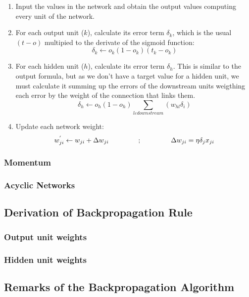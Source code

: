 \documentclass{article}
\begin{document}
		\begin{enumerate}

			\item Input the values in the network and obtain the output values computing every unit of the network.
			\item For each output unit ($k$), calculate its error term $\delta_k$, which is the usual $(t-o)$ multipied to the derivate of the sigmoid function:
				\begin{equation}
					\label{backpropagation_output_error}
					\delta_k \leftarrow o_k (1 - o_k)(t_k - o_k)
				\end{equation}				

			\item For each hidden unit ($h$), calculate its error term $\delta_h$. This is similar to the output formula, but as we don't have a target value for a hidden unit, we must calculate it summing up the errors of the downstream units weigthing each error by the weight of the connection that links them. 
				\begin{equation}
					\label{backpropagation_hidden_error}
					\delta_h \leftarrow o_h (1 - o_h) \sum_{l \varepsilon downstream} (w_{hl} \delta_i)
				\end{equation}

			\item Update each network weight:
				\begin{equation}
					\label{backpropagation_weight_update}
					w^{'}_{ji} \leftarrow w_{ji} + \Delta w_{ji} \hspace{1.5cm} ; \hspace{1.5cm} \Delta w_{ji} = \eta \delta_j x_{ji}
				\end{equation}

		\end{enumerate} 

		\subsubsection{Momentum}
		\subsubsection{Acyclic Networks}
	\subsection{Derivation of Backpropagation Rule}
		\subsubsection{Output unit weights}
		\subsubsection{Hidden unit weights}
	\subsection{Remarks of the Backpropagation Algorithm}
\end{document}
